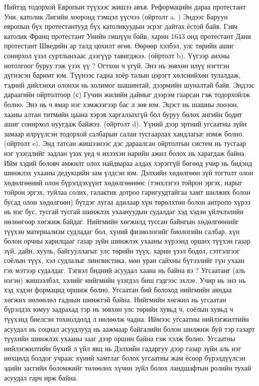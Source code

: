 Нийтэд тодорхой Европын түүхээс жишээ авъя. Реформацийн дараа протестант Уни, католик Лигийн хооронд тэмцэл үүсчээ (ойртолт a. ) Эндээс Баруун европын бүх протестантууд бүх католикуудын эсрэг дайтах ёстой байв. Гэвч католик Франц протестант Унийн гишүүн байв, харин 1643 онд протестант Дани протестант Шведийн ар талд цохилт өгөв. Өөрөөр хэлбэл, улс төрийн ашиг сонирхол үзэл суртлынхаас дээгүүр тавигджээ. (ойртолт b). Үүгээр анхны нотолгоог буруу гэж үзэх үү ? Огтхон ч үгүй. Энэ нь зөвхөн илүү нэгтгэн дүгнэсэн баримт юм. Түүнээс гадна хоёр талын цэрэгт хөлснийхөн тулалдаж, тэдний дийлэнхи олонхи нь холимог шашинтай, дээрмийн шуналтай байв. Эндээс дараагийн ойртолтоор (с) Гучин жилийн дайныг дээрэм гаарсан гэж тодорхойлж болно. Энэ нь ч ямар нэг хэмжээгээр бас л зөв юм. Эцэст нь шашны лоозон, хааны алтан титмийн цаана хэрэв харгалзахгүй бол буруу болох ангийн бодит ашиг сонирхол нуугдаж байжээ. (ойртолт d). Үүний дээр эртний угсаатны зүйн замаар илрүүлсэн тодорхой салбарын салан тусгаарлах хандлагыг нэмж болно. (ойртолт e).
Энд татсан жишээнээс дэс дараалсан ойртолтын систем нь тусгаар нэг үзэгдлийг задлан үзэх үед ч ихээхэн нарийн ажил болох нь харагдаж байна. Ийм хэдий боловч амжилт олох найдвараа алдах хэрэггүй бөгөөд учир нь бидэнд шинжлэх ухааны дедукцийн зам үлдсэн юм. Дэлхийн хөдөлгөөн зүй тогтолт олон хөдөлгөөний олон бүрэлдэхүүнт хөдөлгөөнөөс (тэнхлэгээ тойрон эргэх, нарыг тойрон эргэх, туйлаа солих, галактик дотроо гаригуудтайгаа хамт шилжих болон бусад олон хөдөлгөөн) бүтдэг лугаа адилаар хүн төрөлхтөн болон антропо хүрээ нь нэг бус, тусгай тусгай шинжлэх ухаануудын судалдаг хэд хэдэн үйлчлэлийн нөлөөгөөр хөгжиж байдаг. Нийгмийн хөгжилд туссан байнгын хөдөлгөөнийг түүхэн материализм судладаг бол, хүний физиологийг биологийн салбар, хүн болон орчны харилцааг газар зүйн шинжлэх ухааны хүрээнд орших түүхэн газар зүй, дайн, хууль, байгууллагыг улс төрийн түүх, харин үзэл бодол, сэтгэлгээг соёлын түүх, хэл судлалыг лингвистика, мөн уран сайхны бүтээлийг гүн ухаан гэх мэтээр судалдаг. Тэгвэл бидний асуудал хаана нь байна вэ ?
Угсаатанг (аль нэгэн) жишээлбэл, хэлийг нийгмийн үзэгдэл биш гэдгээс эхлэе. Учир нь энэ нь хэд хэдэн формацид оршиж болно. Угсаатан бий болоход нийгмийн аяндаа хөгжих нөлөөлөл гаднын шинжтэй байна. Нийгмийн хөгжил нь угсаатан бүрэлдэх юмуу задрахад тэр нь зөвхөн улс төрийн хувьд ч, соёлын хувьд ч түүхэнд биелсэн тохиолдолд л нөлөөлж чадна. Иймээс угсаатны нийлэгжилтийн асуудал нь социал асуудлууд нь аажмаар байгалийн болон шилжиж буй тэр газарт түүхийн шинжлэх ухааны зааг дээр оршин байна гэж хэлж болно.
Угсаатны нийлэгжилтийн бүхий л үйл явц нь Дэлхийн гадаргуу дээр газар зүйн аль нэг нөхцөлд болдог учраас хүний хамтлаг болох угсаатны жам ёсоор бүрэлдүүлсэн эдийн засгийн боломжийг төлөөлөх хүчин зүйл болох ландшафтын ролийн тухай асуудал гарч ирж байна.
